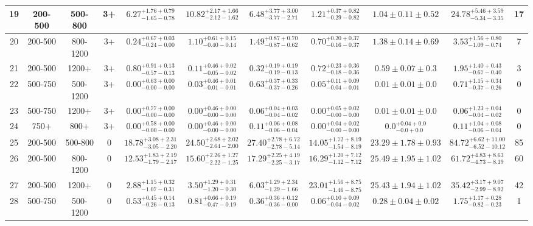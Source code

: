 \begin{table}
{\begin{tabular}{ |c|c|c|c||c|c|c|c|c||c|c| }
19 & 200-500 & 500-800 & 3+ & $6.27^{+1.76+0.79}_{-1.65-0.78}$ & $10.82^{+2.17+1.66}_{-2.12-1.62}$ & $6.48^{+3.77+3.00}_{-3.77-2.71}$ & $1.21^{+0.37+0.82}_{-0.29-0.82}$ &$1.04\pm 0.11 \pm0.52$& $24.78^{+5.46+3.59}_{-5.34-3.35}$ & 17 \\ \hline
20 & 200-500 & 800-1200 & 3+ & $0.24^{+0.67+0.03}_{-0.24-0.00}$ & $1.10^{+0.61+0.15}_{-0.40-0.14}$ & $1.49^{+0.87+0.70}_{-0.87-0.62}$ & $0.70^{+0.20+0.37}_{-0.16-0.37}$ &$1.38\pm 0.14 \pm0.69$& $3.53^{+1.56+0.80}_{-1.09-0.74}$ & 7 \\ \hline
21 & 200-500 & 1200+ & 3+ & $0.80^{+0.91+0.13}_{-0.57-0.13}$ & $0.11^{+0.46+0.02}_{-0.05-0.02}$ & $0.32^{+0.19+0.19}_{-0.19-0.13}$ & $0.72^{+0.23+0.36}_{-0.18-0.36}$ &$0.59\pm 0.07 \pm0.3$& $1.95^{+1.40+0.43}_{-0.67-0.40}$ & 3 \\ \hline
22 & 500-750 & 500-1200 & 3+ & $0.00^{+0.63+0.00}_{-0.00-0.00}$ & $0.03^{+0.46+0.01}_{-0.01-0.01}$ & $0.63^{+0.37+0.33}_{-0.37-0.26}$ & $0.05^{+0.11+0.09}_{-0.04-0.01}$ &$0.01\pm 0.01 \pm0.0$& $0.71^{+1.15+0.34}_{-0.37-0.26}$ & 0 \\ \hline
23 & 500-750 & 1200+ & 3+ & $0.00^{+0.77+0.00}_{-0.00-0.00}$ & $0.00^{+0.46+0.00}_{-0.00-0.00}$ & $0.06^{+0.04+0.03}_{-0.04-0.02}$ & $0.00^{+0.05+0.02}_{-0.00-0.00}$ &$0.01\pm 0.01 \pm0.0$& $0.06^{+1.23+0.04}_{-0.04-0.02}$ & 0 \\ \hline
24 & 750+ & 800+ & 3+ & $0.00^{+0.58+0.00}_{-0.00-0.00}$ & $0.00^{+0.46+0.00}_{-0.00-0.00}$ & $0.11^{+0.06+0.08}_{-0.06-0.04}$ & $0.00^{+0.04+0.02}_{-0.00-0.00}$ &$0.0^{+0.04+0.0}_{-0.0+0.0}$& $0.11^{+1.04+0.08}_{-0.06-0.04}$ & 0 \\ \hline
25 & 200-500 & 500-800 & 0 & $18.78^{+3.08+2.31}_{-3.05-2.20}$ & $24.50^{+2.68+2.02}_{-2.64-2.00}$ & $27.40^{+2.78+6.72}_{-2.78-5.14}$ & $14.05^{+1.72+8.19}_{-1.54-8.19}$ &$23.29\pm 1.78 \pm0.93$& $84.72^{+6.62+11.00}_{-6.52-10.12}$ & 85 \\ \hline
26 & 200-500 & 800-1200 & 0 & $12.53^{+1.83+2.19}_{-1.79-2.17}$ & $15.60^{+2.26+1.27}_{-2.22-1.25}$ & $17.29^{+2.25+4.19}_{-2.25-3.17}$ & $16.29^{+1.20+7.12}_{-1.12-7.12}$ &$25.49\pm 1.95 \pm1.02$& $61.72^{+4.83+8.63}_{-4.73-8.19}$ & 60 \\ \hline
27 & 200-500 & 1200+ & 0 & $2.88^{+1.15+0.32}_{-1.07-0.31}$ & $3.50^{+1.29+0.31}_{-1.20-0.30}$ & $6.03^{+1.29+2.34}_{-1.29-1.66}$ & $23.01^{+1.56+8.75}_{-1.46-8.75}$ &$25.43\pm 1.94 \pm1.02$& $35.42^{+3.17+9.07}_{-2.99-8.92}$ & 42 \\ \hline
28 & 500-750 & 500-1200 & 0 & $0.53^{+0.45+0.14}_{-0.26-0.13}$ & $0.81^{+0.66+0.19}_{-0.47-0.19}$ & $0.36^{+0.36+0.12}_{-0.36-0.00}$ & $0.06^{+0.10+0.09}_{-0.04-0.02}$ &$0.28\pm 0.04 \pm0.02$& $1.75^{+1.17+0.28}_{-0.82-0.23}$ & 1 \\ \hline

\end{tabular}}
\end{table}
